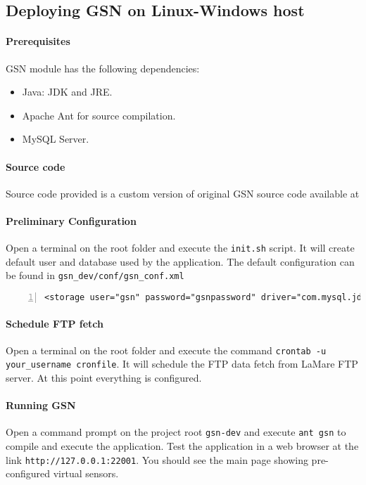 \subsection{Deploying GSN on Linux-Windows host}
\paragraph{Prerequisites} GSN module has the following dependencies:
\begin{itemize}
	\item Java: JDK and JRE.
	\item Apache Ant for source compilation.
	\item MySQL Server.
\end{itemize}
\paragraph{Source code} Source code provided is a custom version of original GSN 
source code available at \cite{epfl1}
\paragraph{Preliminary Configuration} Open a terminal on the root folder and execute the {\tt init.sh} script. It will create
 default user and database used by the application. The default configuration can be found in {\tt gsn\_dev/conf/gsn\_conf.xml}
\begin{lstlisting}[numbers=left, breaklines=true]
<storage user="gsn" password="gsnpassword" driver="com.mysql.jdbc.Driver" url="jdbc:mysql://localhost/gsn" />
\end{lstlisting}
\paragraph{Schedule FTP fetch} Open a terminal on the root folder and execute the command {\tt crontab -u your\_username cronfile}. It will schedule the FTP data fetch from LaMare FTP server. At this point everything is configured.
\paragraph{Running GSN} Open a command prompt on the project root {\tt gsn-dev} and execute 
{\tt ant gsn} to compile and execute the application. Test the application in a web browser at the link
{\tt http://127.0.0.1:22001}. You should see the main page showing pre-configured virtual sensors.
